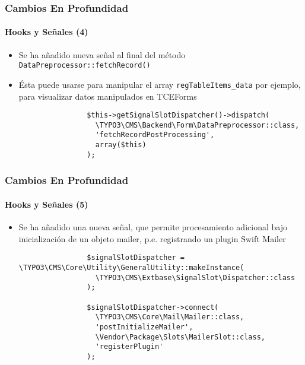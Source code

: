 
\begin{frame}[fragile]
	\frametitle{Cambios En Profundidad}
	\framesubtitle{Hooks y Señales (4)}

	\begin{itemize}

		\item Se ha añadido nueva señal al final del método \texttt{DataPreprocessor::fetchRecord()}
		\item Ésta puede usarse para manipular el array \texttt{regTableItems\_data} por ejemplo,
			para visualizar datos manipulados en TCEForms

			\begin{lstlisting}
				$this->getSignalSlotDispatcher()->dispatch(
				  \TYPO3\CMS\Backend\Form\DataPreprocessor::class,
				  'fetchRecordPostProcessing',
				  array($this)
				);
			\end{lstlisting}

	\end{itemize}

\end{frame}


\begin{frame}[fragile]
	\frametitle{Cambios En Profundidad}
	\framesubtitle{Hooks y Señales (5)}

	\lstset{basicstyle=\tiny\ttfamily}

	\begin{itemize}

		\item Se ha añadido una nueva señal, que permite procesamiento adicional bajo
			inicialización de un objeto mailer, p.e. registrando un plugin Swift Mailer

			\begin{lstlisting}
				$signalSlotDispatcher = \TYPO3\CMS\Core\Utility\GeneralUtility::makeInstance(
				  \TYPO3\CMS\Extbase\SignalSlot\Dispatcher::class
				);

				$signalSlotDispatcher->connect(
				  \TYPO3\CMS\Core\Mail\Mailer::class,
				  'postInitializeMailer',
				  \Vendor\Package\Slots\MailerSlot::class,
				  'registerPlugin'
				);
		\end{lstlisting}

	\end{itemize}

\end{frame}

